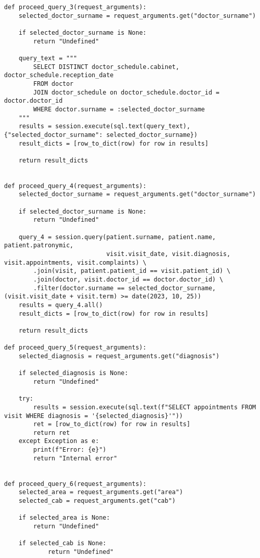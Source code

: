 \documentclass{article}
\begin{document}
{\begin{verbatim}
def proceed_query_3(request_arguments):
    selected_doctor_surname = request_arguments.get("doctor_surname")

    if selected_doctor_surname is None:
        return "Undefined"

    query_text = """
        SELECT DISTINCT doctor_schedule.cabinet, doctor_schedule.reception_date
        FROM doctor
        JOIN doctor_schedule on doctor_schedule.doctor_id = doctor.doctor_id
        WHERE doctor.surname = :selected_doctor_surname
    """
    results = session.execute(sql.text(query_text), {"selected_doctor_surname": selected_doctor_surname})
    result_dicts = [row_to_dict(row) for row in results]

    return result_dicts
    

def proceed_query_4(request_arguments):
    selected_doctor_surname = request_arguments.get("doctor_surname")

    if selected_doctor_surname is None:
        return "Undefined"

    query_4 = session.query(patient.surname, patient.name, patient.patronymic,
                            visit.visit_date, visit.diagnosis, visit.appointments, visit.complaints) \
        .join(visit, patient.patient_id == visit.patient_id) \
        .join(doctor, visit.doctor_id == doctor.doctor_id) \
        .filter(doctor.surname == selected_doctor_surname, (visit.visit_date + visit.term) >= date(2023, 10, 25))
    results = query_4.all()
    result_dicts = [row_to_dict(row) for row in results]

    return result_dicts

def proceed_query_5(request_arguments):
    selected_diagnosis = request_arguments.get("diagnosis")

    if selected_diagnosis is None:
        return "Undefined"

    try:
        results = session.execute(sql.text(f"SELECT appointments FROM visit WHERE diagnosis = '{selected_diagnosis}'"))
        ret = [row_to_dict(row) for row in results]
        return ret
    except Exception as e:
        print(f"Error: {e}")
        return "Internal error"
    

def proceed_query_6(request_arguments):
    selected_area = request_arguments.get("area")
    selected_cab = request_arguments.get("cab")

    if selected_area is None:
        return "Undefined"
    
    if selected_cab is None:
            return "Undefined"
    


\end{verbatim}}
\end{document}
